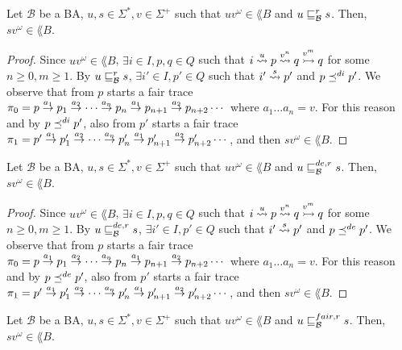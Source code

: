 \begin{proposition}
\label{proposition:wrdir-substitution}
Let $\mathcal{B}$ be a BA, $u,s \in \Sigma^*, v \in \Sigma^+$
such that $uv ^{\omega} \in \lang{B}$ and $u \sqsubseteq_{\mathcal{B}}^r s$.
Then, $sv ^{\omega} \in \lang{B}$.
\end{proposition}

\begin{proof}
Since $uv ^{\omega} \in \lang{B}$, $\exists i \in I, p,q \in Q$ such that
$i \overset{u}{\rightsquigarrow} p \overset{v^n}{\rightsquigarrow} q \overset{v^m}{\rightarrowtail} q$ for some $n \geq 0,m \geq 1$.
By $u \sqsubseteq_{\mathcal{B}}^r s$, $\exists i' \in I, p' \in Q$ such that $i' \overset{s}{\rightsquigarrow} p'$
and $p \preceq^{di} p'$.
We observe that from $p$ starts a fair trace
$\pi_0 = p \overset{a_1}{\rightarrow} p_1 \overset{a_2}{\rightarrow} \cdots \overset{a_n}{\rightarrow} p_n \overset{a_1}{\rightarrow} p_{n+1} \overset{a_2}{\rightarrow} p_{n+2} \cdots$
where $a_1 \dots a_n = v$.
For this reason and by $p \preceq^{di} p'$, also from $p'$ starts a fair trace
$\pi_1 = p' \overset{a_1}{\rightarrow} p_1' \overset{a_2}{\rightarrow} \cdots \overset{a_n}{\rightarrow} p_n' \overset{a_1}{\rightarrow} p_{n+1}' \overset{a_2}{\rightarrow} p_{n+2}' \cdots$,
and then $sv ^{\omega} \in \lang{B}$.
\end{proof}

\begin{proposition}
\label{proposition:wrdel-substitution}
Let $\mathcal{B}$ be a BA, $u,s \in \Sigma^*, v \in \Sigma^+$
such that $uv ^{\omega} \in \lang{B}$ and $u \sqsubseteq_{\mathcal{B}}^{de,r} s$.
Then, $sv ^{\omega} \in \lang{B}$.
\end{proposition}

\begin{proof}
Since $uv ^{\omega} \in \lang{B}$, $\exists i \in I, p,q \in Q$ such that
$i \overset{u}{\rightsquigarrow} p \overset{v^n}{\rightsquigarrow} q \overset{v^m}{\rightarrowtail} q$ for some $n \geq 0,m \geq 1$.
By $u \sqsubseteq_{\mathcal{B}}^{de,r} s$, $\exists i' \in I, p' \in Q$ such that $i' \overset{s}{\rightsquigarrow} p'$
and $p \preceq^{de} p'$.
We observe that from $p$ starts a fair trace
$\pi_0 = p \overset{a_1}{\rightarrow} p_1 \overset{a_2}{\rightarrow} \cdots \overset{a_n}{\rightarrow} p_n \overset{a_1}{\rightarrow} p_{n+1} \overset{a_2}{\rightarrow} p_{n+2} \cdots$
where $a_1 \dots a_n = v$.
For this reason and by $p \preceq^{de} p'$, also from $p'$ starts a fair trace
$\pi_1 = p' \overset{a_1}{\rightarrow} p_1' \overset{a_2}{\rightarrow} \cdots \overset{a_n}{\rightarrow} p_n' \overset{a_1}{\rightarrow} p_{n+1}' \overset{a_2}{\rightarrow} p_{n+2}' \cdots$,
and then $sv ^{\omega} \in \lang{B}$.
\end{proof}

\begin{proposition}
\label{proposition:wrfair-substitution}
Let $\mathcal{B}$ be a BA, $u,s \in \Sigma^*, v \in \Sigma^+$
such that $uv ^{\omega} \in \lang{B}$ and $u \sqsubseteq_{\mathcal{B}}^{fair,r} s$.
Then, $sv ^{\omega} \in \lang{B}$.
\end{proposition}


